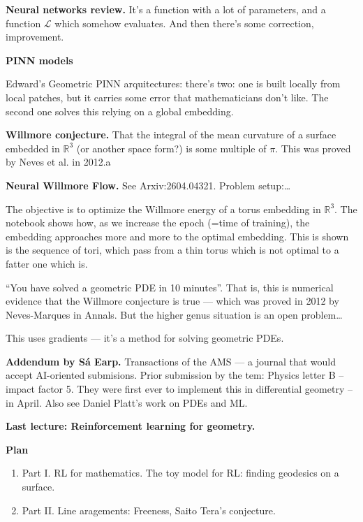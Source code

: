 \medskip\noindent
{\bf Neural networks review.}
It's a function with a lot of parameters,
and a function $\mathcal{L}$ which
somehow evaluates. And then there's 
some correction, improvement.
 
\medskip\noindent
{\bf PINN models}

Edward's Geometric PINN arquitectures:
there's two: one is built locally from local
patches, but it carries some error that
mathematicians don't like. The second one
solves this relying on a global embedding.

\medskip\noindent
{\bf Willmore conjecture.}
That the integral of the mean curvature
of a surface embedded in $\mathbb{R}^3$ (or
another space form?) is some multiple of
$\pi$. This was proved by Neves et al. in
2012.a

\medskip\noindent
{\bf Neural Willmore Flow.}
See Arxiv:2604.04321.
Problem setup:…

The objective is to optimize the Willmore
energy of a torus embedding in
$\mathbb{R}^3$.
The notebook shows how, as we increase
the epoch (=time of training), the embedding
approaches more and more to the optimal
embedding. This is shown is the sequence of
tori, which pass from a thin torus which is
not optimal to a fatter one which is.

``You have solved a geometric PDE in 10
minutes''. That is, this is numerical
evidence that the Willmore conjecture is
true --- which was proved in 2012 by
Neves-Marques in Annals. But the higher genus
situation is an open problem…

This uses gradients --- it's a method for
solving geometric PDEs.


\medskip\noindent
{\bf Addendum by Sá Earp.}
Transactions of the AMS --- a journal
that would accept AI-oriented submisions.
Prior submission by the tem: 
Physics letter B -- impact factor 5.
They were first ever to implement this in 
differential geometry -- in April.
Also see Daniel Platt's work on
PDEs and ML.


\medskip\noindent
{\bf Last lecture:
Reinforcement learning for geometry.}

\medskip\noindent
{\bf Plan} 
\begin{enumerate}
\item Part I. RL for mathematics.
The toy model for RL: finding geodesics
on a surface.
\item Part II. Line aragements: Freeness,
Saito Tera's conjecture.
\end{enumerate}

